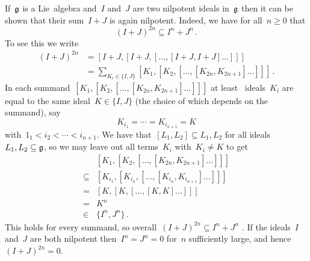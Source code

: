 \begin{remark}
  If~$\mathfrak{g}$ is a Lie~algebra and~$I$ and~$J$ are two nilpotent ideals in~$\mathfrak{g}$ then it can be shown that their sum~$I+J$ is again nilpotent.
  Indeed, we have for all~$n \geq 0$ that
  \[
    (I + J)^{2n}
    \subseteq
    I^n + J^n \,.
  \]
  To see this we write
  \begin{align*}
    (I + J)^{2n}
    &=
    [I+J, [I+J, [\dotsc, [I+J, I+J] \dotsc] ] ]
    \\
    &=
    \sum_{K_i \in \{I, J\}}
    [K_1, [K_2, [\dotsc, [K_{2n}, K_{2n+1}] \dotsc] ] ] \,.
  \end{align*}
  In each summand~$[K_1, [K_2, [\dotsc, [K_{2n}, K_{2n+1}] \dotsc] ] ]$ at least~{} ideals~$K_i$ are equal to the same ideal~$K \in \{I, J\}$ (the choice of which depends on the summand), say
  \[
    K_{i_1}
    =
    \dotsb
    =
    K_{i_{n+1}}
    =
    K
  \]
  with~$1_1 < i_2 < \dotsb < i_{n+1}$.
  We have that~$[L_1, L_2] \subseteq L_1, L_2$ for all ideals~$L_1, L_2 \subseteq \mathfrak{g}$, so we may leave out all terms~$K_i$ with~$K_i \neq K$ to get
  \begin{align*}
    {}&
    [K_1, [K_2, [\dotsc, [K_{2n}, K_{2n+1}] \dotsc] ] ]
    \\
    \subseteq{}&
    [K_{i_1}, [K_{i_n}, [\dotsc, [K_{i_n}, K_{i_{n+1}}] \dotsc] ] ]
    \\
    ={}&
    [K, [K, [\dotsc, [K, K] \dotsc] ] ]
    \\
    ={}&
    K^n
    \\
    \in{}&
    \{I^n, J^n\}  \,.
  \end{align*}
  This holds for every summand, so overall~$(I + J)^{2n} \subseteq I^n + J^n$ .
  If the ideals~$I$ and~$J$ are both nilpotent then~$I^n = J^n = 0$ for~$n$ sufficiently large, and hence~$(I + J)^{2n} = 0$.

\end{remark}

